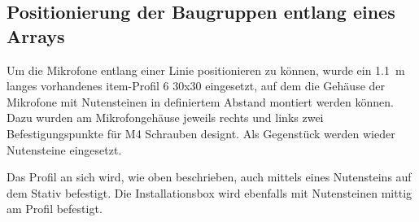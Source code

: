 \subsection{Positionierung der Baugruppen entlang eines Arrays}

Um die Mikrofone entlang einer Linie positionieren zu können, wurde ein \SI{1,1}{m} langes vorhandenes item-Profil 6 30x30 eingesetzt, auf dem die Gehäuse der Mikrofone mit Nutensteinen in definiertem Abstand montiert werden können. Dazu wurden am Mikrofongehäuse jeweils rechts und links zwei Befestigungspunkte für M4 Schrauben designt. Als Gegenstück werden wieder Nutensteine eingesetzt.

Das Profil an sich wird, wie oben beschrieben, auch mittels eines Nutensteins auf dem Stativ befestigt. Die Installationsbox wird ebenfalls mit Nutensteinen mittig am Profil befestigt.

\newpage